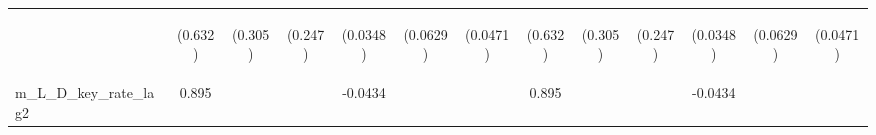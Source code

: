 \documentclass[]{article}
\begin{document}
\begin{center}
\begin{tabular}{lcccccccccccc}
\vspace{4pt} & \begin{footnotesize}(0.632)\end{footnotesize} & \begin{footnotesize}(0.305)\end{footnotesize} & \begin{footnotesize}(0.247)\end{footnotesize} & \begin{footnotesize}(0.0348)\end{footnotesize} & \begin{footnotesize}(0.0629)\end{footnotesize} & \begin{footnotesize}(0.0471)\end{footnotesize} & \begin{footnotesize}(0.632)\end{footnotesize} & \begin{footnotesize}(0.305)\end{footnotesize} & \begin{footnotesize}(0.247)\end{footnotesize} & \begin{footnotesize}(0.0348)\end{footnotesize} & \begin{footnotesize}(0.0629)\end{footnotesize} & \begin{footnotesize}(0.0471)\end{footnotesize} \\
m\_L\_D\_key\_rate\_lag2 & 0.895 &  &  & -0.0434 &  &  & 0.895 &  &  & -0.0434 &  &  \\

\end{tabular}
\end{center}
\end{document}
